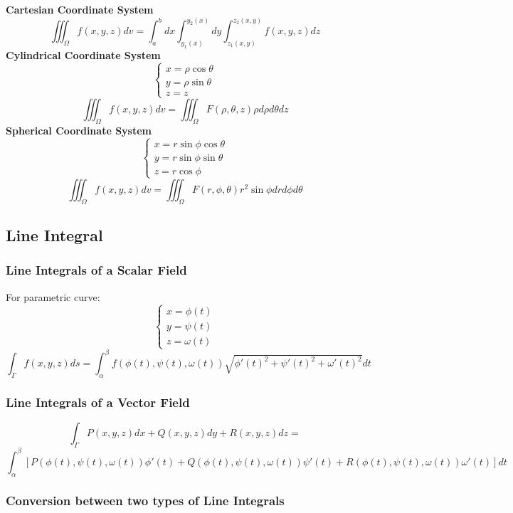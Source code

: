 \documentclass{article}
\begin{document}
\textbf{Cartesian Coordinate System}
\[
    \iiint_\Omega f(x, y, z) dv = \int_a^b dx \int_{y_1(x)}^{y_2(x)} dy \int_{z_1(x, y)}^{z_2(x, y)} f(x, y, z) dz
\]
\textbf{Cylindrical Coordinate System}
\[
    \begin{cases}
        x = \rho \cos \theta \\
        y = \rho \sin \theta \\
        z = z
    \end{cases}
\]
\[
    \iiint_\Omega f(x, y, z) dv = \iiint_\Omega F(\rho, \theta, z) \rho d\rho d\theta dz
\]
\textbf{Spherical Coordinate System}
\[
    \begin{cases}
        x = r \sin \phi \cos \theta \\
        y = r \sin \phi \sin \theta \\
        z = r \cos \phi
    \end{cases}
\]
\[
    \iiint_\Omega f(x, y, z) dv = \iiint_\Omega F(r, \phi, \theta) r^2 \sin \phi dr d\phi d\theta
\]

\subsection{Line Integral}

\subsubsection{Line Integrals of a Scalar Field}

For parametric curve:
\[
    \begin{cases}
        x = \phi(t) \\
        y = \psi(t) \\
        z = \omega(t)
    \end{cases}
\]
\[
    \int_\Gamma f(x, y, z) ds = \int_\alpha^\beta f(\phi(t), \psi(t), \omega(t)) \sqrt{\phi'(t)^2 + \psi'(t)^2 + \omega'(t)^2} dt
\]

\subsubsection{Line Integrals of a Vector Field}

\[
    \int_\Gamma P(x, y, z) dx + Q(x, y, z) dy + R(x, y, z) dz =
\]
\[
    \int_\alpha^\beta \left[P(\phi(t), \psi(t), \omega(t)) \phi'(t) + Q(\phi(t), \psi(t), \omega(t)) \psi'(t) + R(\phi(t), \psi(t), \omega(t)) \omega'(t)\right] dt
\]

\subsubsection{Conversion between two types of Line Integrals}
\end{document}
